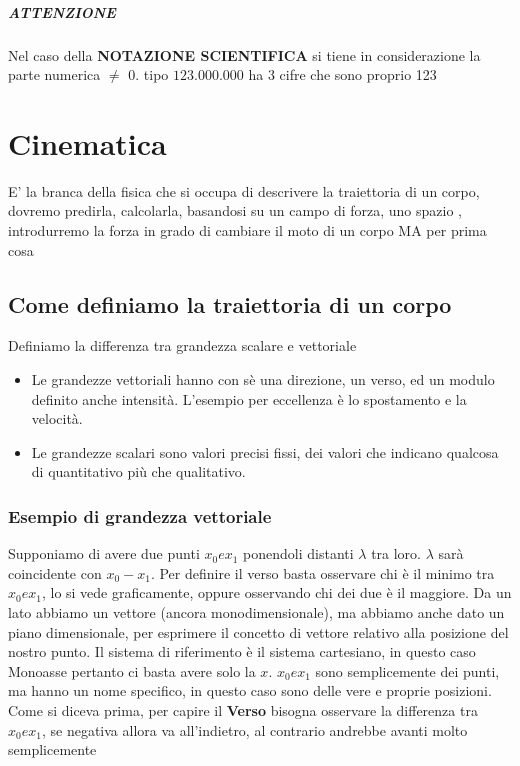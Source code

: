 \documentclass[12pt, a4paper, openany, oneside]{book}
\begin{document}
\paragraph{ATTENZIONE} Nel caso della \textbf{NOTAZIONE SCIENTIFICA} si tiene
in considerazione la parte numerica $\neq$ 0. tipo $123.000.000$ ha 3 cifre che 
sono proprio 123
\chapter{Cinematica}
E' la branca della fisica che si occupa di descrivere la traiettoria di un 
corpo, dovremo predirla, calcolarla, basandosi su un campo di forza, uno spazio
, introdurremo la forza in grado di cambiare il moto di un corpo MA per prima 
cosa
\section{Come definiamo la traiettoria di un corpo}
Definiamo la differenza tra grandezza scalare e vettoriale
\begin{itemize}
	\item Le grandezze vettoriali hanno con sè una direzione, un verso, ed un
	 modulo definito anche intensità. L'esempio per eccellenza è lo spostamento 
	 e la velocità.
	\item Le grandezze scalari sono valori precisi fissi, dei valori che indicano 
	qualcosa di quantitativo più che qualitativo.
\end{itemize}
\subsection{Esempio di grandezza vettoriale}
Supponiamo di avere due punti $x_{0} e x_{1}$ ponendoli distanti $\lambda$ tra 
loro. $\lambda$ sarà coincidente con $x_{0} - x_{1}$. Per definire il verso
basta osservare chi è il minimo tra $x_{0} e x_{1}$, lo si vede graficamente,
oppure osservando chi dei due è il maggiore. 
\newline \newline
Da un lato abbiamo un vettore (ancora monodimensionale), ma abbiamo anche 
dato un piano dimensionale, per esprimere il concetto di vettore relativo alla
posizione del nostro punto.
\newline \newline
Il sistema di riferimento è il sistema cartesiano, in questo caso Monoasse 
pertanto ci basta avere solo la $x$. $x_{0} e x_{1}$ sono semplicemente dei 
punti, ma hanno un nome specifico, in questo caso sono delle vere e proprie
posizioni.
\newline \newline
Come si diceva prima, per capire il \textbf{Verso} bisogna osservare la differenza
tra $x_{0} e x_{1}$, se negativa allora va all'indietro, al contrario andrebbe 
avanti molto semplicemente
\end{document}
